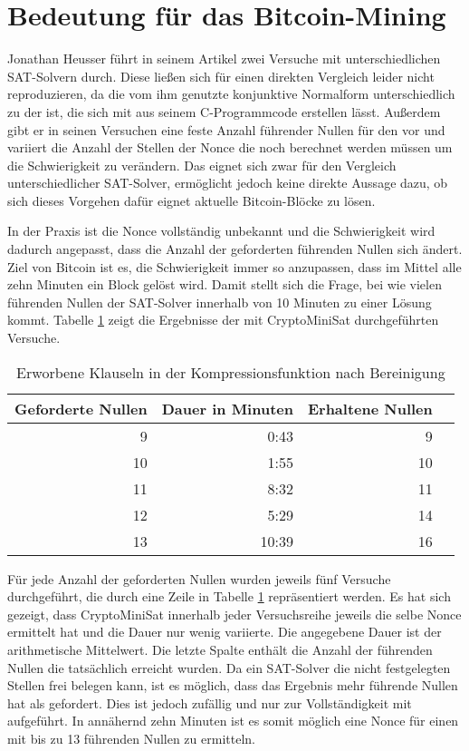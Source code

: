 \section{Bedeutung für das Bitcoin-Mining}

Jonathan Heusser führt in seinem Artikel \cite{jona:1} zwei Versuche mit unterschiedlichen SAT-Solvern durch.
Diese ließen sich für einen direkten Vergleich leider nicht reproduzieren, da die vom ihm genutzte konjunktive
Normalform unterschiedlich zu der ist, die sich mit  aus seinem C-Programmcode erstellen lässt.
Außerdem gibt er in seinen Versuchen eine feste Anzahl führender Nullen für den  vor und variiert die
Anzahl der Stellen der Nonce die noch berechnet werden müssen um die Schwierigkeit zu verändern. Das eignet
sich zwar für den Vergleich unterschiedlicher SAT-Solver, ermöglicht jedoch keine direkte Aussage dazu, ob
sich dieses Vorgehen dafür eignet aktuelle Bitcoin-Blöcke zu lösen.

In der Praxis ist die Nonce vollständig unbekannt und die Schwierigkeit wird dadurch angepasst, dass die Anzahl
der geforderten führenden Nullen sich ändert. Ziel von Bitcoin ist es, die Schwierigkeit immer so anzupassen, dass im Mittel
alle zehn Minuten ein Block gelöst wird. Damit stellt sich die Frage, bei wie vielen führenden Nullen der SAT-Solver
innerhalb von 10 Minuten zu einer Lösung kommt. Tabelle \ref{fig:bitcoinzeros} zeigt die Ergebnisse der mit CryptoMiniSat
durchgeführten Versuche.

\begin{table}[!h]
  \centering
  \begin{tabular}{rr|rr}
    Geforderte Nullen & Dauer in Minuten & Erhaltene Nullen \\
    \hline
     9 &  0:43 &  9 \\
    10 &  1:55 & 10 \\
    11 &  8:32 & 11 \\
    12 &  5:29 & 14 \\
    13 & 10:39 & 16
  \end{tabular}
  \caption{Erworbene Klauseln in der Kompressionsfunktion nach Bereinigung}
  \label{fig:bitcoinzeros}
\end{table}

Für jede Anzahl der geforderten Nullen wurden jeweils fünf Versuche durchgeführt, die durch eine Zeile in Tabelle \ref{fig:bitcoinzeros}
repräsentiert werden. Es hat sich gezeigt, dass CryptoMiniSat innerhalb jeder Versuchsreihe jeweils die selbe Nonce ermittelt hat
und die Dauer nur wenig variierte. Die angegebene Dauer ist der arithmetische Mittelwert. Die letzte Spalte enthält die Anzahl der
führenden Nullen die tatsächlich erreicht wurden. Da ein SAT-Solver die nicht festgelegten Stellen frei belegen kann, ist es möglich,
dass das Ergebnis mehr führende Nullen hat als gefordert. Dies ist jedoch zufällig und nur zur Vollständigkeit mit aufgeführt.
In annähernd zehn Minuten ist es somit möglich eine Nonce für einen  mit bis zu 13 führenden Nullen zu ermitteln.

